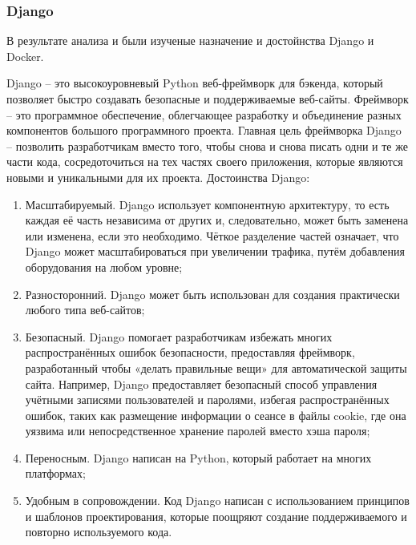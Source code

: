 \def\notedate{2022.10.24}
\def\currentauthor{Василян А.Р. (РК6-73Б)}

\subsubsection{Django}
В результате анализа \cite{Django-intro} и \cite{Docker-intro} были изученые назначение и достойнства Django и Docker.

Django -- это высокоуровневый Python веб-фреймворк для бэкенда, который позволяет быстро создавать безопасные и поддерживаемые веб-сайты. Фреймворк -- это программное обеспечение, облегчающее разработку и объединение разных компонентов большого программного проекта.
	Главная цель фреймворка Django – позволить разработчикам вместо того, чтобы снова и снова писать одни и те же части кода, сосредоточиться на тех частях своего приложения, которые являются новыми и уникальными для их проекта.
	Достоинства Django:
\begin{enumerate}
	\item Масштабируемый.  Django использует компонентную архитектуру, то есть каждая её часть независима от других и, следовательно, может быть заменена или изменена, если это необходимо. Чёткое разделение частей означает, что Django может масштабироваться при увеличении трафика, путём добавления оборудования на любом уровне;
	\item Разносторонний. Django может быть использован для создания практически любого типа веб-сайтов;
	\item Безопасный. Django помогает разработчикам избежать многих распространённых ошибок безопасности, предоставляя фреймворк, разработанный чтобы «делать правильные вещи» для автоматической защиты сайта. Например, Django предоставляет безопасный способ управления учётными записями пользователей и паролями, избегая распространённых ошибок, таких как размещение информации о сеансе в файлы cookie, где она уязвима или непосредственное хранение паролей вместо хэша пароля;
	\item Переносным. Django написан на Python, который работает на многих платформах;
	\item Удобным в сопровождении. Код Django написан с использованием принципов и шаблонов проектирования, которые поощряют создание поддерживаемого и повторно используемого кода.
\end{enumerate}

